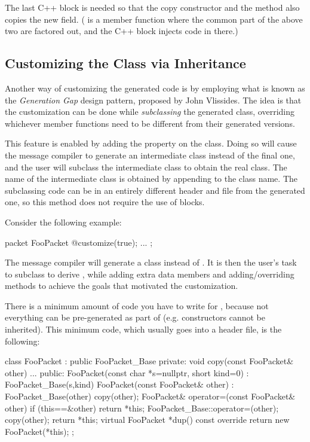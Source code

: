 The last C++ block is needed so that the copy constructor and the
 method also copies the new field. ( is a member
function where the common part of the above two are factored out, and the C++
block injects code in there.)


\subsection{Customizing the Class via Inheritance}
\label{sec:msg-defs:customizing-via-inheritance}

Another way of customizing the generated code is by employing what is known as
the \textit{Generation Gap} design pattern, proposed by John Vlissides. The idea
is that the customization can be done while \textit{subclassing} the generated
class, overriding whichever member functions need to be different from their
generated versions.

This feature is enabled by adding the  property on the class.
Doing so will cause the message compiler to generate an intermediate class
instead of the final one, and the user will subclass the intermediate class to
obtain the real class. The name of the intermediate class is obtained by
appending  to the class name. The subclassing code can be in an
entirely different header and  file from the generated one, so this
method does not require the use of  blocks.

Consider the following example:

\begin{msg}
packet FooPacket
{
   @customize(true);
   ...
};
\end{msg}

The message compiler will generate a  class instead of
. It is then the user's task to subclass  to
derive , while adding extra data members and adding/overriding
methods to achieve the goals that motivated the customization.

There is a minimum amount of code you have to write for , because
not everything can be pre-generated as part of  (e.g.
constructors cannot be inherited). This minimum code, which usually goes into a
header file, is the following:

\begin{cpp}
class FooPacket : public FooPacket_Base
{
  private:
    void copy(const FooPacket& other) { ... }
  public:
    FooPacket(const char *s=nullptr, short kind=0) : FooPacket_Base(s,kind) {}
    FooPacket(const FooPacket& other) : FooPacket_Base(other) {copy(other);}
    FooPacket& operator=(const FooPacket& other) {if (this==&other) return *this;
        FooPacket_Base::operator=(other); copy(other); return *this;}
    virtual FooPacket *dup() const override {return new FooPacket(*this);}
};
\end{cpp}

